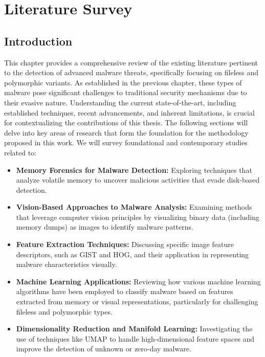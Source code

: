 \chapter{Literature Survey}

\section{Introduction}
\label{sec:lit_review_intro}

This chapter provides a comprehensive review of the existing literature pertinent to the detection of advanced malware threats, specifically focusing on fileless and polymorphic variants. As established in the previous chapter, these types of malware pose significant challenges to traditional security mechanisms due to their evasive nature. Understanding the current state-of-the-art, including established techniques, recent advancements, and inherent limitations, is crucial for contextualizing the contributions of this thesis. The following sections will delve into key areas of research that form the foundation for the methodology proposed in this work. We will survey foundational and contemporary studies related to:
\begin{itemize}
    \item \textbf{Memory Forensics for Malware Detection:} Exploring techniques that analyze volatile memory to uncover malicious activities that evade disk-based detection.
    \item \textbf{Vision-Based Approaches to Malware Analysis:} Examining methods that leverage computer vision principles by visualizing binary data (including memory dumps) as images to identify malware patterns.
    \item \textbf{Feature Extraction Techniques:} Discussing specific image feature descriptors, such as GIST and HOG, and their application in representing malware characteristics visually.
    \item \textbf{Machine Learning Applications:} Reviewing how various machine learning algorithms have been employed to classify malware based on features extracted from memory or visual representations, particularly for challenging fileless and polymorphic types.
    \item \textbf{Dimensionality Reduction and Manifold Learning:} Investigating the use of techniques like UMAP to handle high-dimensional feature spaces and improve the detection of unknown or zero-day malware.
\end{itemize}

